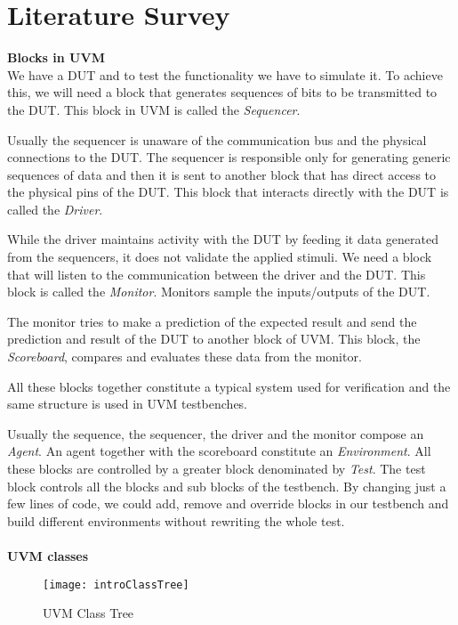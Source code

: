 \documentclass[a4paper,11pt]{article}
\begin{document}
\section{Literature Survey}

\textbf{Blocks in UVM}
\ \\
We have a DUT and to test the functionality we have to simulate it. To achieve this, we will need a block that generates sequences of bits to be transmitted to the DUT. This block in UVM is called the \textit{Sequencer}.

Usually the sequencer is unaware of the communication bus and the physical connections to the DUT. The sequencer is responsible only for generating generic sequences of data and then it is sent to another block that has direct access to the physical pins of the DUT. This block that interacts directly with the DUT is called the \textit{Driver}.\cite{colorlesscube}

While the driver maintains activity with the DUT by feeding it data generated from the sequencers, it does not validate the applied stimuli. We need a block that will listen to the communication between the driver and the DUT. This block is called the \textit{Monitor}. Monitors sample the inputs/outputs of the DUT.

The monitor tries to make a prediction of the expected result and send the prediction and result of the DUT to another block of UVM. This block, the \textit{Scoreboard}, compares and evaluates these data from the monitor.

All these blocks together constitute a typical system used for verification and the same structure is used in UVM testbenches.

Usually the sequence, the sequencer, the driver and the monitor compose an \textit{Agent}. An agent together with the scoreboard constitute an \textit{Environment}. All these blocks are controlled by a greater block denominated by \textit{Test}. The test block controls all the blocks and sub blocks of the testbench. By changing just a few lines of code, we could add, remove and override blocks in our testbench and build different environments without rewriting the whole test.\cite{colorlesscube}
\ \\
\ \\
\textbf{UVM classes}
\ \\

\begin{figure}[ht]
\centering
\texttt{[image: introClassTree]}
\label{fig:UVM Class Tree}
\caption{UVM Class Tree\cite{colorlesscube}}
\end{figure}
\end{document}
